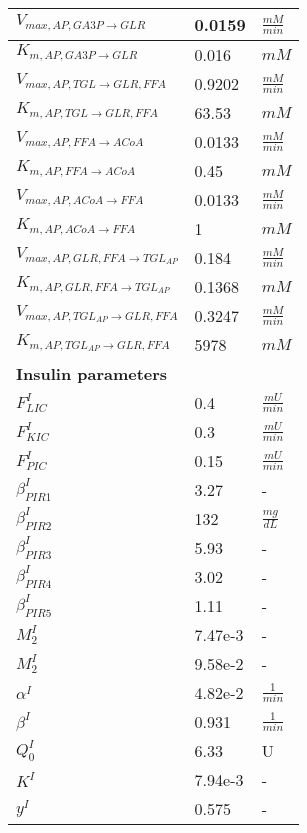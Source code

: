 \begin{supertabular}{lll}
$V_{max, AP,GA3P \xrightarrow[]{} GLR}$ & 0.0159 & $\frac{mM}{min}$       \\ \hline
$K_{m, AP,GA3P \xrightarrow[]{} GLR}$ & 0.016 & $mM$   \\ \hline

$V_{max, AP,TGL \xrightarrow[]{} GLR , FFA}$ & 0.9202 & $\frac{mM}{min}$       \\ \hline
$K_{m, AP,TGL \xrightarrow[]{} GLR , FFA}$ & 63.53 & $mM$   \\ \hline

$V_{max, AP,FFA \xrightarrow[]{} ACoA}$ & 0.0133 & $\frac{mM}{min}$       \\ \hline
$K_{m, AP,FFA \xrightarrow[]{} ACoA}$ & 0.45 & $mM$   \\ \hline

$V_{max, AP,ACoA \xrightarrow[]{} FFA}$ & 0.0133 & $\frac{mM}{min}$       \\ \hline
$K_{m, AP,ACoA \xrightarrow[]{} FFA}$ & 1 & $mM$   \\ \hline

$V_{max, AP,GLR, FFA \xrightarrow[]{} TGL_{AP}}$ & 0.184 & $\frac{mM}{min}$       \\ \hline
$K_{m, AP,GLR, FFA \xrightarrow[]{} TGL_{AP}}$ & 0.1368 & $mM$   \\ \hline

$V_{max, AP,TGL_{AP} \xrightarrow[]{} GLR, FFA}$ & 0.3247 & $\frac{mM}{min}$       \\ \hline
$K_{m, AP,TGL_{AP} \xrightarrow[]{} GLR, FFA}$ & 5978 & $mM$   \\ \hline


\textbf{Insulin parameters} \\ \hline
$F_{LIC}^I$     & 0.4       &  $\frac{mU}{min}$       \\ \hline
$F_{KIC}^I$     & 0.3       &  $\frac{mU}{min}$      \\ \hline
$F_{PIC}^I$     & 0.15      &  $\frac{mU}{min}$      \\  \hline

$\beta_{PIR1}^I$     & 3.27      &  -      \\ \hline
$\beta_{PIR2}^I$     & 132       & $\frac{mg}{dL}$       \\ \hline
$\beta_{PIR3}^I$     & 5.93      &  -      \\ \hline
$\beta_{PIR4}^I$     & 3.02      &  -      \\ \hline
$\beta_{PIR5}^I$     & 1.11      &  -      \\ \hline
$M_{2}^I$       & 7.47e-3      &    -    \\ \hline
$M_{2}^I$       & 9.58e-2      &    -    \\ \hline
$\alpha^I$      & 4.82e-2        & $\frac{1}{min}$       \\ \hline
$\beta^I$       & 0.931       & $\frac{1}{min}$       \\ \hline
$Q_{0}^I$       & 6.33       & U       \\ \hline
$K^I$           & 7.94e-3      &    -    \\ 
$y^I$           & 0.575       &     -   \\ \hline



\end{supertabular}

